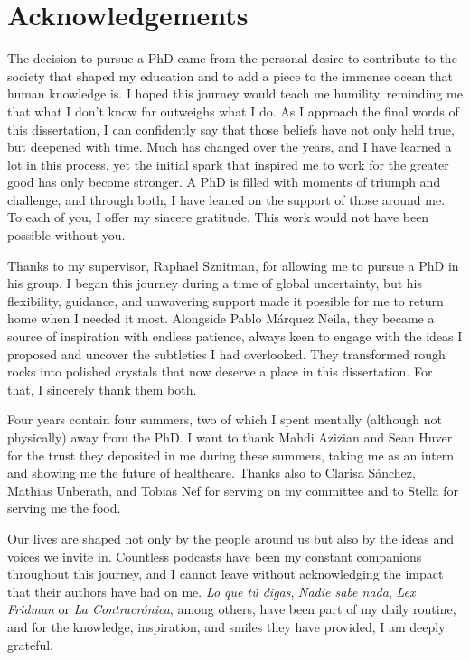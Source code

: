 \chapter*{Acknowledgements}

The decision to pursue a PhD came from the personal desire to contribute to the society that shaped my education and to add a piece to the immense ocean that human knowledge is. I hoped this journey would teach me humility, reminding me that what I don’t know far outweighs what I do. As I approach the final words of this dissertation, I can confidently say that those beliefs have not only held true, but deepened with time. Much has changed over the years, and I have learned a lot in this process, yet the initial spark that inspired me to work for the greater good has only become stronger. A PhD is filled with moments of triumph and challenge, and through both, I have leaned on the support of those around me. To each of you, I offer my sincere gratitude. This work would not have been possible without you.

Thanks to my supervisor, Raphael Sznitman, for allowing me to pursue a PhD in his group. I began this journey during a time of global uncertainty, but his flexibility, guidance, and unwavering support made it possible for me to return home when I needed it most. Alongside Pablo Márquez Neila, they became a source of inspiration with endless patience, always keen to engage with the ideas I proposed and uncover the subtleties I had overlooked. They transformed rough rocks into polished crystals that now deserve a place in this dissertation. For that, I sincerely thank them both.

Four years contain four summers, two of which I spent mentally (although not physically) away from the PhD. I want to thank Mahdi Azizian and Sean Huver for the trust they deposited in me during these summers, taking me as an intern and showing me the future of healthcare. Thanks also to Clarisa Sánchez, Mathias Unberath, and Tobias Nef for serving on my committee and to Stella\textsuperscript{\textcopyright} for serving me the food.

Our lives are shaped not only by the people around us but also by the ideas and voices we invite in. Countless podcasts have been my constant companions throughout this journey, and I cannot leave without acknowledging the impact that their authors have had on me. \textit{Lo que tú digas}, \textit{Nadie sabe nada}, \textit{Lex Fridman} or \textit{La Contracrónica}, among others, have been part of my daily routine, and for the knowledge, inspiration, and smiles they have provided, I am deeply grateful.

